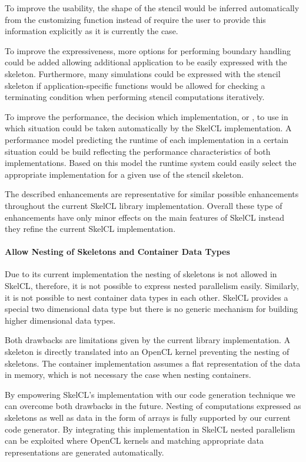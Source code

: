 To improve the usability, the shape of the stencil would be inferred automatically from the customizing function instead of require the user to provide this information explicitly as it is currently the case.

To improve the expressiveness, more options for performing boundary handling could be added allowing additional application to be easily expressed with the skeleton.
Furthermore, many simulations could be expressed with the stencil skeleton if application-specific functions would be allowed for checking a terminating condition when performing stencil computations iteratively.

To improve the performance, the decision which implementation,  or , to use in which situation could be taken automatically by the SkelCL implementation.
A performance model predicting the runtime of each implementation in a certain situation could be build reflecting the performance characteristics of both implementations.
Based on this model the runtime system could easily select the appropriate implementation for a given use of the stencil skeleton.

\bigskip
The described enhancements are representative for similar possible enhancements throughout the current SkelCL library implementation.
Overall these type of enhancements have only minor effects on the main features of SkelCL instead they refine the current SkelCL implementation.

\paragraph{Allow Nesting of Skeletons and Container Data Types}
Due to its current implementation the nesting of skeletons is not allowed in SkelCL, therefore, it is not possible to express nested parallelism easily.
Similarly, it is not possible to nest container data types in each other.
SkelCL provides a special two dimensional data type but there is no generic mechanism for building higher dimensional data types.

Both drawbacks are limitations given by the current library implementation.
A skeleton is directly translated into an OpenCL kernel preventing the nesting of skeletons.
The container implementation assumes a flat representation of the data in memory, which is not necessary the case when nesting containers.

By empowering SkelCL's implementation with our code generation technique we can overcome both drawbacks in the future.
Nesting of computations expressed as skeletons as well as data in the form of arrays is fully supported by our current code generator.
By integrating this implementation in SkelCL nested parallelism can be exploited where OpenCL kernels and matching appropriate data representations are generated automatically.

